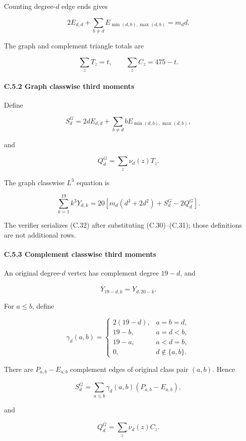\documentclass[
  english,
  11pt,
  a4paper,
]{article}
\begin{document}
Counting degree-\(d\) edge ends gives

\[
2E_{d,d}+\sum_{b\ne d}E_{\min(d,b),\max(d,b)}=m_dd.
\tag{C.28}
\]

The graph and complement triangle totals are

\[
\sum_zT_z=t,\qquad
\sum_zC_z=475-t.
\tag{C.29}
\]

\paragraph{C.5.2 Graph classwise third
moments}\label{c.5.2-graph-classwise-third-moments}

Define

\[
S_d^G
=2dE_{d,d}
+\sum_{b\ne d}bE_{\min(d,b),\max(d,b)},
\tag{C.30}
\]

and

\[
Q_d^G=\sum_z\nu_d(z)T_z.
\tag{C.31}
\]

The graph classwise \(L^3\) equation is

\[
\sum_{k=1}^{19}k^3Y_{d,k}
=20\left[m_d(d^3+2d^2)+S_d^G-2Q_d^G\right].
\tag{C.32}
\]

The verifier serializes (C.32) after substituting (C.30)--(C.31); those
definitions are not additional rows.

\paragraph{C.5.3 Complement classwise third
moments}\label{c.5.3-complement-classwise-third-moments}

An original degree-\(d\) vertex has complement degree \(19-d\), and

\[
\overline Y_{19-d,k}=Y_{d,20-k}.
\tag{C.33}
\]

For \(a\le b\), define

\[
\gamma_d(a,b)=
\begin{cases}
2(19-d),&a=b=d,\\
19-b,&a=d<b,\\
19-a,&a<d=b,\\
0,&d\notin\{a,b\}.
\end{cases}
\tag{C.34}
\]

There are \(P_{a,b}-E_{a,b}\) complement edges of original class pair
\((a,b)\). Hence

\[
S_d^{\overline G}
=\sum_{a\le b}\gamma_d(a,b)(P_{a,b}-E_{a,b}),
\tag{C.35}
\]

and

\[
Q_d^{\overline G}=\sum_z\nu_d(z)C_z.
\tag{C.36}
\]
\end{document}
